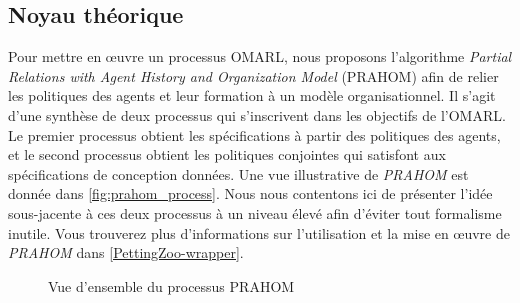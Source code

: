 \subsection{Noyau théorique}

Pour mettre en œuvre un processus OMARL, nous proposons l'algorithme \emph{Partial Relations with Agent History and Organization Model} (PRAHOM) afin de relier les politiques des agents et leur formation à un modèle organisationnel.
Il s'agit d'une synthèse de deux processus qui s'inscrivent dans les objectifs de l'OMARL. Le premier processus obtient les spécifications à partir des politiques des agents, et le second processus obtient les politiques conjointes qui satisfont aux spécifications de conception données. Une vue illustrative de \emph{PRAHOM} est donnée dans \autoref{fig:prahom_process}.
Nous nous contentons ici de présenter l'idée sous-jacente à ces deux processus à un niveau élevé afin d'éviter tout formalisme inutile. Vous trouverez plus d'informations sur l'utilisation et la mise en œuvre de \emph{PRAHOM} dans \autoref{PettingZoo-wrapper}.

\begin{figure}[h!]
  \centering
  
  \caption{Vue d'ensemble du processus PRAHOM}
  \label{fig:prahom_process}
\end{figure}





